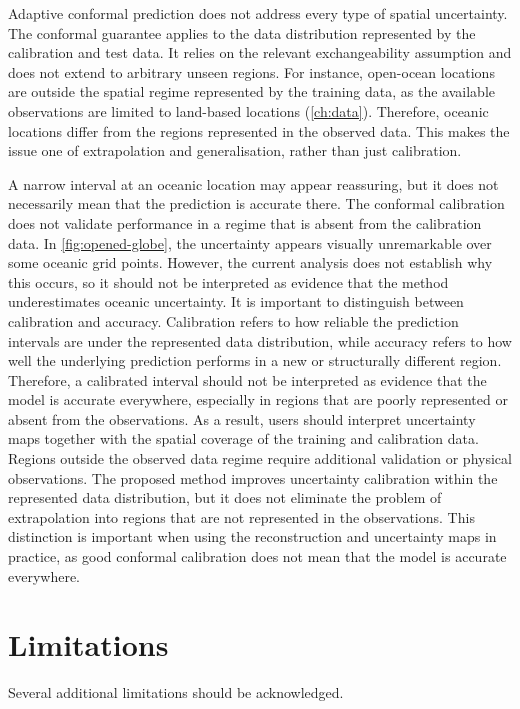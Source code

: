 \documentclass[11pt,a4paper]{report}
\begin{document}
Adaptive conformal prediction does not address every type of spatial uncertainty. The conformal guarantee applies to the data distribution represented by the calibration and test data. It relies on the relevant exchangeability assumption and does not extend to arbitrary unseen regions. For instance, open-ocean locations are outside the spatial regime represented by the training data, as the available observations are limited to land-based locations (\cref{ch:data}). Therefore, oceanic locations differ from the regions represented in the observed data. This makes the issue one of extrapolation and generalisation, rather than just calibration.

A narrow interval at an oceanic location may appear reassuring, but it does not necessarily mean that the prediction is accurate there. The conformal calibration does not validate performance in a regime that is absent from the calibration data. In \cref{fig:opened-globe}, the uncertainty appears visually unremarkable over some oceanic grid points. However, the current analysis does not establish why this occurs, so it should not be interpreted as evidence that the method underestimates oceanic uncertainty. It is important to distinguish between calibration and accuracy. Calibration refers to how reliable the prediction intervals are under the represented data distribution, while accuracy refers to how well the underlying prediction performs in a new or structurally different region. Therefore, a calibrated interval should not be interpreted as evidence that the model is accurate everywhere, especially in regions that are poorly represented or absent from the observations. As a result, users should interpret uncertainty maps together with the spatial coverage of the training and calibration data. Regions outside the observed data regime require additional validation or physical observations. The proposed method improves uncertainty calibration within the represented data distribution, but it does not eliminate the problem of extrapolation into regions that are not represented in the observations. This distinction is important when using the reconstruction and uncertainty maps in practice, as good conformal calibration does not mean that the model is accurate everywhere.

\section{Limitations}

Several additional limitations should be acknowledged. 
\end{document}
